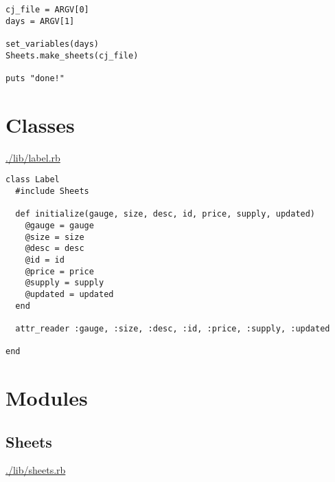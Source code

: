 \documentclass[11pt]{article}
\begin{document}
\begin{verbatim}
cj_file = ARGV[0]
days = ARGV[1]

set_variables(days)
Sheets.make_sheets(cj_file)

puts "done!"
\end{verbatim}
\section{Classes}
\label{sec-4}

\url{./lib/label.rb}

\begin{verbatim}
class Label
  #include Sheets

  def initialize(gauge, size, desc, id, price, supply, updated)
    @gauge = gauge
    @size = size
    @desc = desc
    @id = id
    @price = price
    @supply = supply
    @updated = updated
  end

  attr_reader :gauge, :size, :desc, :id, :price, :supply, :updated

end
\end{verbatim}

\section{Modules}
\label{sec-5}

\subsection{Sheets}
\label{sec-5-1}

\url{./lib/sheets.rb}
\end{document}
